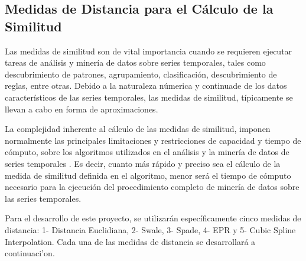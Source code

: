 \subsection{Medidas de Distancia para el C\'alculo de la Similitud}
Las medidas de similitud son de vital importancia cuando se requieren ejecutar tareas de an\'alisis y miner\'ia de datos sobre series temporales, tales como descubrimiento de patrones, agrupamiento, clasificaci\'on, descubrimiento de reglas, entre otras. Debido a la naturaleza n\'umerica y continuade de los datos caracter\'isticos de las series temporales, las medidas de similitud, t\'ipicamente se llevan a cabo en forma de aproximaciones.\par
La complejidad inherente al c\'alculo de las medidas de similitud, imponen normalmente las principales limitaciones y restricciones de capacidad y tiempo de c\'omputo, sobre los algoritmos utilizados en el an\'alisis y la miner\'ia de datos de series temporales \cite{algoanalysis}. Es decir, cuanto m\'as r\'apido y preciso sea el c\'alculo de la medida de similitud definida en el algoritmo, menor ser\'a el tiempo de c\'omputo necesario para la ejecuci\'on del procedimiento completo de miner\'ia de datos sobre las series temporales.\par
Para el desarrollo de este proyecto, se utilizar\'an espec\'ificamente cinco medidas de distancia: 1- Distancia Euclidiana, 2-  Swale, 3- Spade, 4- EPR y 5- Cubic Spline Interpolation. Cada una de las medidas de distancia se desarrollar\'a a continuaci'on.
